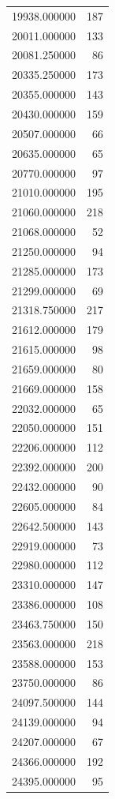 \begin{tabular}{lr}
19938.000000  &   187 \\
20011.000000  &   133 \\
20081.250000  &    86 \\
20335.250000  &   173 \\
20355.000000  &   143 \\
20430.000000  &   159 \\
20507.000000  &    66 \\
20635.000000  &    65 \\
20770.000000  &    97 \\
21010.000000  &   195 \\
21060.000000  &   218 \\
21068.000000  &    52 \\
21250.000000  &    94 \\
21285.000000  &   173 \\
21299.000000  &    69 \\
21318.750000  &   217 \\
21612.000000  &   179 \\
21615.000000  &    98 \\
21659.000000  &    80 \\
21669.000000  &   158 \\
22032.000000  &    65 \\
22050.000000  &   151 \\
22206.000000  &   112 \\
22392.000000  &   200 \\
22432.000000  &    90 \\
22605.000000  &    84 \\
22642.500000  &   143 \\
22919.000000  &    73 \\
22980.000000  &   112 \\
23310.000000  &   147 \\
23386.000000  &   108 \\
23463.750000  &   150 \\
23563.000000  &   218 \\
23588.000000  &   153 \\
23750.000000  &    86 \\
24097.500000  &   144 \\
24139.000000  &    94 \\
24207.000000  &    67 \\
24366.000000  &   192 \\
24395.000000  &    95 \\

\end{tabular}
